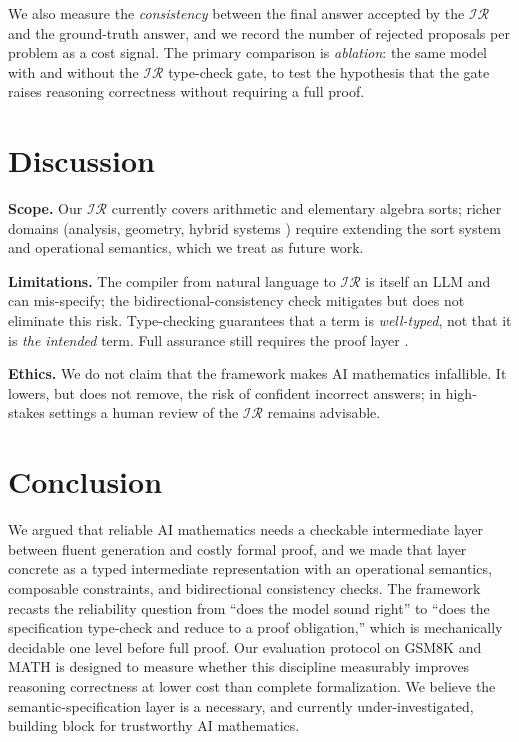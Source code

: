 \documentclass[11pt]{article}
\newcommand{\IR}{\ensuremath{\mathcal{IR}}}
\begin{document}
We also measure the \emph{consistency} between the final answer accepted by the
\IR{} and the ground-truth answer, and we record the number of rejected
proposals per problem as a cost signal. The primary comparison is
\emph{ablation}: the same model with and without the \IR{} type-check gate, to
test the hypothesis that the gate raises reasoning correctness without
requiring a full proof.

\section{Discussion}
\label{sec:discussion}

\textbf{Scope.} Our \IR{} currently covers arithmetic and elementary algebra
sorts; richer domains (analysis, geometry, hybrid systems
\citep{fulton2015keymaera}) require extending the sort system and operational
semantics, which we treat as future work.

\textbf{Limitations.} The compiler from natural language to \IR{} is itself an
LLM and can mis-specify; the bidirectional-consistency check mitigates but does
not eliminate this risk. Type-checking guarantees that a term is
\emph{well-typed}, not that it is \emph{the intended} term. Full assurance
still requires the proof layer \citep{sozeau2019coqcoqcorrect}.

\textbf{Ethics.} We do not claim that the framework makes AI mathematics
infallible. It lowers, but does not remove, the risk of confident incorrect
answers; in high-stakes settings a human review of the \IR{} remains advisable.

\section{Conclusion}
\label{sec:conclusion}

We argued that reliable AI mathematics needs a checkable intermediate layer
between fluent generation and costly formal proof, and we made that layer
concrete as a typed intermediate representation with an operational semantics,
composable constraints, and bidirectional consistency checks. The framework
recasts the reliability question from ``does the model sound right'' to ``does
the specification type-check and reduce to a proof obligation,'' which is
mechanically decidable one level before full proof. Our evaluation protocol on
GSM8K and MATH is designed to measure whether this discipline measurably
improves reasoning correctness at lower cost than complete formalization. We
believe the semantic-specification layer is a necessary, and currently
under-investigated, building block for trustworthy AI mathematics.



\end{document}
